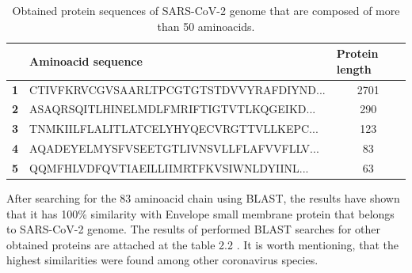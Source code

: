 \begin{table}[]
    \caption{Obtained protein sequences of SARS-CoV-2 genome that are composed of more than 50 aminoacids.}\label{t:1}
	\smallskip
	\centering
    
    \begin{tabular}{|l|l|c|}
    \hline
    \textbf{ } & \textbf{Aminoacid sequence}                                                     & \multicolumn{1}{l|}{\textbf{Protein length}} \\ \hline
    \textbf{1} & CTIVFKRVCGVSAARLTPCGTGTSTDVVYRAFDIYND... & 2701                                         \\ \hline
    \textbf{2} & ASAQRSQITLHINELMDLFMRIFTIGTVTLKQGEIKD... & 290                                          \\ \hline
    \textbf{3} & TNMKIILFLALITLATCELYHYQECVRGTTVLLKEPC... & 123                                          \\ \hline
    \textbf{4} & AQADEYELMYSFVSEETGTLIVNSVLLFLAFVVFLLV... & 83                                           \\ \hline
    \textbf{5} & QQMFHLVDFQVTIAEILLIIMRTFKVSIWNLDYIINL... & 63                                           \\ \hline
    \end{tabular}
\end{table}

After searching for the 83 aminoacid chain using BLAST, the results have shown that it has 100\% similarity with Envelope small membrane protein that belongs to SARS-CoV-2 genome.
The results of performed BLAST searches for other obtained proteins are attached at the table 2.2 .
It is worth mentioning, that the highest similarities were found among other coronavirus species.

